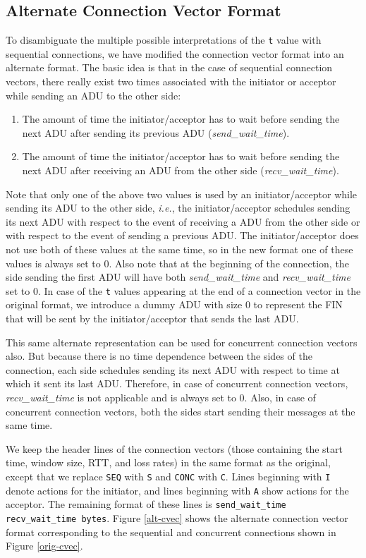 \subsection{Alternate Connection Vector Format}

To disambiguate the multiple possible interpretations of the
\texttt{t} value with sequential connections, we have modified the
connection vector format into an alternate format.  The basic idea is
that in the case of sequential connection vectors, there really exist
two times associated with the initiator or acceptor while sending an
ADU to the other side:
\begin{enumerate}
\item{The amount of time the initiator/acceptor has to wait before
sending the next ADU after sending its previous ADU
(\emph{send\_wait\_time}).} 
\item{The amount of time the initiator/acceptor has to wait before
sending the next ADU after receiving an ADU from the other side
(\emph{recv\_wait\_time}).}
\end{enumerate}
Note that only one of the above two values is used by an
initiator/acceptor while sending its ADU to the other side,
\emph{i.e.}, the initiator/acceptor schedules sending its next ADU
with respect to the event of receiving a ADU from the other side or
with respect to the event of sending a previous ADU.  The
initiator/acceptor does not use both of these values at the same time,
so in the new format one of these values is always set to 0. Also note
that at the beginning of the connection, the side sending the first
ADU will have both \emph{send\_wait\_time} and \emph{recv\_wait\_time}
set to 0. In case of the \texttt{t} values appearing at the end of a
connection vector in the original format, we introduce a dummy ADU
with size 0 to represent the FIN that will be sent by the
initiator/acceptor that sends the last ADU.

This same alternate representation can be used for concurrent
connection vectors also.  But because there is no time dependence
between the sides of the connection, each side schedules sending its
next ADU with respect to time at which it sent its last
ADU. Therefore, in case of concurrent connection vectors,
\emph{recv\_wait\_time} is not applicable and is always set to
0. Also, in case of concurrent connection vectors, both the sides
start sending their messages at the same time.

We keep the header lines of the connection vectors (those containing
the start time, window size, RTT, and loss rates) in the same format
as the original, except that we replace \texttt{SEQ} with \texttt{S}
and \texttt{CONC} with \texttt{C}\@.  Lines beginning with \texttt{I}
denote actions for the initiator, and lines beginning with \texttt{A}
show actions for the acceptor.  The remaining format of these lines is
\texttt{send\_wait\_time recv\_wait\_time bytes}.  Figure
\ref{alt-cvec} shows the alternate connection vector format
corresponding to the sequential and concurrent connections shown in
Figure \ref{orig-cvec}.

